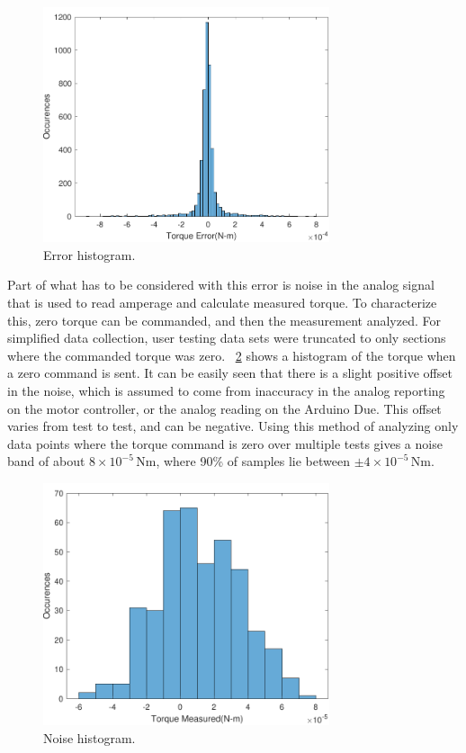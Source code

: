 \documentclass[hardware,article,submit,pdftex,moreauthors]{Definitions/mdpi}
\begin{document}
\begin{figure}[tb]
  \centering
  \includegraphics[width=0.75\textwidth]{diagrams/ErrorHistogram.pdf}
  \caption{Error histogram.}
  \label{fig:ErrorHistogram}
\end{figure}

Part of what has to be considered with this error is noise in the analog signal that is used to read amperage and calculate measured torque.
To characterize this, zero torque can be commanded, and then the measurement analyzed.  
For simplified data collection, user testing data sets were truncated to only sections where the commanded torque was zero.
\figurename~\ref{fig:NoiseHistogram} shows a histogram of the torque when a zero command is sent.
It can be easily seen that there is a slight positive offset in the noise, which is assumed to come from inaccuracy in the analog reporting on the motor controller, or the analog reading on the Arduino Due.
This offset varies from test to test, and can be negative.
Using this method of analyzing only data points where the torque command is zero over multiple tests gives a noise band of about $8 \times 10^{-5}$\,Nm, where 90\% of samples lie between $\pm 4 \times 10^{-5}$\,Nm.

\begin{figure}[tb]
  \centering
  \includegraphics[width=0.75\textwidth]{diagrams/NoiseHistogram.pdf}
  \caption{Noise histogram.}
  \label{fig:NoiseHistogram}
\end{figure}
\end{document}
